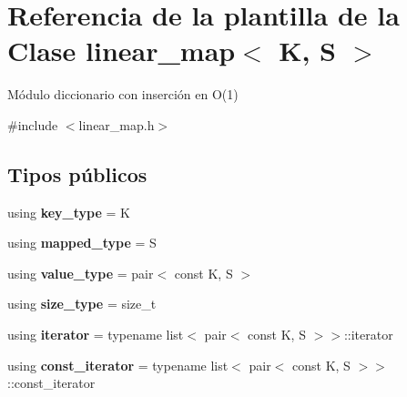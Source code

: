 \hypertarget{classlinear__map}{\section{Referencia de la plantilla de la Clase linear\+\_\+map$<$ K, S $>$}
\label{classlinear__map}
}


Módulo diccionario con inserción en O(1)  




{\ttfamily \#include $<$linear\+\_\+map.\+h$>$}

\subsection*{Tipos públicos}
\begin{DoxyCompactItemize}
\item 
\hypertarget{classlinear__map_a85577f6aa54870bf9b5d2f85f0749078}{using {\bfseries key\+\_\+type} = K}\label{classlinear__map_a85577f6aa54870bf9b5d2f85f0749078}

\item 
\hypertarget{classlinear__map_aaed4a6810a4a46c0cede18821069cc65}{using {\bfseries mapped\+\_\+type} = S}\label{classlinear__map_aaed4a6810a4a46c0cede18821069cc65}

\item 
\hypertarget{classlinear__map_a8bf7640c132d7e6fa5c4e68e1623d27d}{using {\bfseries value\+\_\+type} = pair$<$ const K, S $>$}\label{classlinear__map_a8bf7640c132d7e6fa5c4e68e1623d27d}

\item 
\hypertarget{classlinear__map_a08095dfd88596e72f10d59a212b622f8}{using {\bfseries size\+\_\+type} = size\+\_\+t}\label{classlinear__map_a08095dfd88596e72f10d59a212b622f8}

\item 
\hypertarget{classlinear__map_a26639947def2ce8549cde3fdd31bd42e}{using {\bfseries iterator} = typename list$<$ pair$<$ const K, S $>$$>$\+::iterator}\label{classlinear__map_a26639947def2ce8549cde3fdd31bd42e}

\item 
\hypertarget{classlinear__map_ae4a408774a63cf33acbb0397b64972e5}{using {\bfseries const\+\_\+iterator} = typename list$<$ pair$<$ const K, S $>$$>$\+::const\+\_\+iterator}\label{classlinear__map_ae4a408774a63cf33acbb0397b64972e5}

\end{DoxyCompactItemize}
